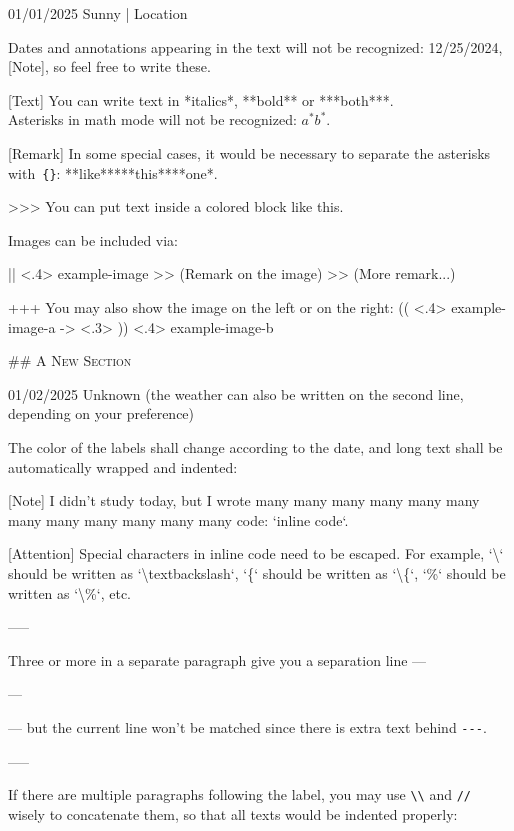 \documentclass[11pt, paperstyle=light yellow, color entry, month-day-year,
  title in boldface, title in sffamily, use style = classical]{jwjournal}
\begin{document}
01/01/2025 Sunny | Location

  Dates and annotations appearing in the text will not be recognized: 12/25/2024, [Note], so feel free to write these.

  [Text]
    You can write text in *italics*, **bold** or ***both***.
    \\
    Asterisks in math mode will not be recognized: $a^* b^*$.

  [Remark] In some special cases, it would be necessary to separate the asterisks with~\texttt{\{\}}: **like**{}***this***{}*one*.

  >>> You can put text inside a colored block like this.

  Images can be included via:

  || <.4> {example-image} %
  >> (Remark on the image)
  >> (More remark...)

  +++
  You may also show the image on the left or on the right:
  (( <.4> {example-image-a} %
  -> <.3> %
  )) <.4> {example-image-b} %


## {\textsc{A New Section}}

01/02/2025
Unknown (the weather can also be written on the second line, depending on your preference)

  The color of the labels shall change according to the date, and long text shall be automatically wrapped and indented:

  [Note] I didn't study today, but I wrote many many many many many many many many many many many many code: `inline code`.

  [Attention] Special characters in inline code need to be escaped. For example, `\textbackslash` should be written as `\textbackslash textbackslash`, `\{` should be written as `\textbackslash\{`, `\%` should be written as `\textbackslash\%`, etc.

  -----

  Three or more \textquote{\texttt{-}} in a separate paragraph give you a separation line ---

  ---

  --- but the current line won't be matched since there is extra text behind \texttt{-}\texttt{-}\texttt{-}.

  -----

  If there are multiple paragraphs following the label, you may use \texttt{\textbackslash\textbackslash} and \texttt{\slash\slash} wisely to concatenate them, so that all texts would be indented properly:
\end{document}
